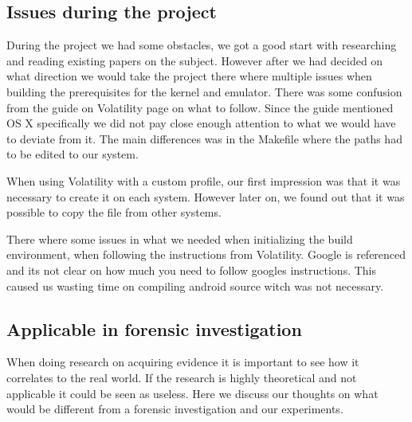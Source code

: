 \subsection{Issues during the project}
During the project we had some obstacles, we got a good start with researching and 
reading existing papers on the subject. However after we had decided on what 
direction we would take the project there where multiple issues when building the 
prerequisites for the kernel and emulator. There was some confusion from the guide 
on Volatility page on what to follow. Since the guide mentioned OS X specifically 
we did not pay close enough attention to what we would have to deviate from it.
The main differences was in the Makefile where the paths had to be edited to our
system.

When using Volatility with a custom profile, our first impression was that it was
necessary to create it on each system. However later on, we found out that it was possible 
to copy the file from other systems.

There where some issues in what we needed when initializing the build environment, when 
following the instructions from Volatility. Google is referenced and its not clear 
on how much you need to follow googles instructions. This caused us wasting time 
on compiling android source witch was not necessary.


\subsection{Applicable in forensic investigation}
When doing research on acquiring evidence it is important to see how it correlates 
to the real world. If the research is highly theoretical and not applicable it 
could be seen as useless. Here we discuss our thoughts on what would be different 
from a forensic investigation and our experiments.